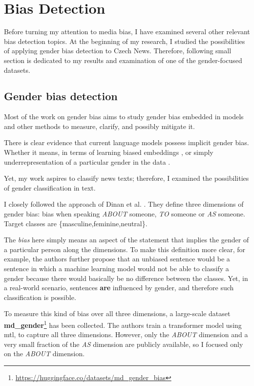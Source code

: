 \chapter{Bias Detection}
Before turning my attention to media bias, I have examined several other relevant bias detection topics. At the beginning of my research, I studied the possibilities of applying gender bias detection to Czech News. Therefore, following small section is dedicated to my results and examination of one of the gender-focused datasets.


\section{Gender bias detection}\label{gender}
Most of the work on gender bias aims to study gender bias embedded in models and other methods to measure, clarify, and possibly mitigate it.

There is clear evidence that current language models possess implicit gender bias. Whether it means, in terms of learning biased embeddings \cite{bolukbasi2016man}, or simply underrepresentation of a particular gender in the data \cite{sun-peng-2021-men}. 

Yet, my work aspires to classify news texts; therefore, I examined the possibilities of gender classification in text.

I closely followed the approach of Dinan et al. \cite{dinan2020multi}. They define three dimensions of gender bias: bias when speaking \textit{ABOUT} someone, \textit{TO} someone or \textit{AS} someone. Target classes are \{masculine,feminine,neutral\}. 

The \textit{bias} here simply means an aspect of the statement that implies the gender of a particular person along the dimensions. To make this definition more clear, for example, the authors further propose that an unbiased sentence would be a sentence in which a machine learning model would not be able to classify a gender because there would basically be no difference between the classes. Yet, in a real-world scenario, sentences \textbf{are} influenced by gender, and therefore such classification is possible.

To measure this kind of bias over all three dimensions, a large-scale dataset \textbf{md\_gender}\footnote{\url{https://huggingface.co/datasets/md_gender_bias}} has been collected. The authors train a transformer model using \Gls{mtl}, to capture all three dimensions. However, only the \textit{ABOUT} dimension and a very small fraction of the \textit{AS} dimension are publicly available, so I focused only on the \textit{ABOUT} dimension.

